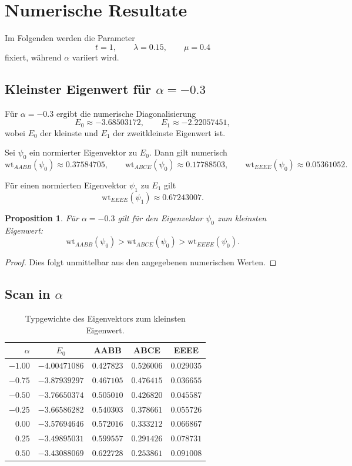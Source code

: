 \documentclass[11pt,a4paper]{article}
\newtheorem{proposition}[definition]{Proposition}
\theoremstyle{remark}
\newcommand{\wt}{\mathrm{wt}}
\begin{document}
	\section{Numerische Resultate}
	
	Im Folgenden werden die Parameter
	\[
	t=1,\qquad \lambda=0.15,\qquad \mu=0.4
	\]
	fixiert, während \(\alpha\) variiert wird.
	
	\subsection{Kleinster Eigenwert für \texorpdfstring{$\alpha=-0.3$}{alpha=-0.3}}
	
	Für \(\alpha=-0.3\) ergibt die numerische Diagonalisierung
	\[
	E_0\approx -3.68503172,\qquad E_1\approx -2.22057451,
	\]
	wobei \(E_0\) der kleinste und \(E_1\) der zweitkleinste Eigenwert ist.
	
	Sei \(\psi_0\) ein normierter Eigenvektor zu \(E_0\). Dann gilt numerisch
	\[
	\wt_{AABB}(\psi_0)\approx 0.37584705,\qquad
	\wt_{ABCE}(\psi_0)\approx 0.17788503,\qquad
	\wt_{EEEE}(\psi_0)\approx 0.05361052.
	\]
	
	Für einen normierten Eigenvektor \(\psi_1\) zu \(E_1\) gilt
	\[
	\wt_{EEEE}(\psi_1)\approx 0.67243007.
	\]
	
	\begin{proposition}
		Für \(\alpha=-0.3\) gilt für den Eigenvektor \(\psi_0\) zum kleinsten Eigenwert:
		\[
		\wt_{AABB}(\psi_0)>\wt_{ABCE}(\psi_0)>\wt_{EEEE}(\psi_0).
		\]
	\end{proposition}
	
	\begin{proof}
		Dies folgt unmittelbar aus den angegebenen numerischen Werten.
	\end{proof}
	
	\subsection{Scan in \texorpdfstring{$\alpha$}{alpha}}
	
	\begin{table}[h]
		\centering
		\begin{tabular}{rcccc}
			\toprule
			$\alpha$ & $E_0$ & AABB & ABCE & EEEE \\
			\midrule
			$-1.00$ & $-4.00471086$ & $0.427823$ & $0.526006$ & $0.029035$ \\
			$-0.75$ & $-3.87939297$ & $0.467105$ & $0.476415$ & $0.036655$ \\
			$-0.50$ & $-3.76650374$ & $0.505010$ & $0.426820$ & $0.045587$ \\
			$-0.25$ & $-3.66586282$ & $0.540303$ & $0.378661$ & $0.055726$ \\
			$0.00$  & $-3.57694646$ & $0.572016$ & $0.333212$ & $0.066867$ \\
			$0.25$  & $-3.49895031$ & $0.599557$ & $0.291426$ & $0.078731$ \\
			$0.50$  & $-3.43088069$ & $0.622728$ & $0.253861$ & $0.091008$ \\
			\bottomrule
		\end{tabular}
		\caption{Typgewichte des Eigenvektors zum kleinsten Eigenwert.}
	\end{table}
	
\end{document}
